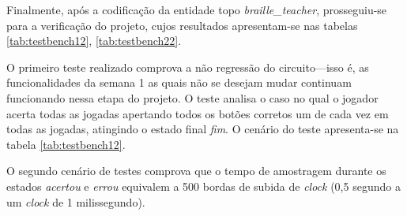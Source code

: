 \documentclass[amsmath,amssymb,floatfix]{report}
\begin{document}
Finalmente, após a codificação da entidade topo \textit{braille\_teacher}, prosseguiu-se para a verificação do projeto, cujos resultados apresentam-se nas tabelas \ref{tab:testbench12}, \ref{tab:testbench22}.

O primeiro teste realizado comprova a não regressão do circuito---isso é, as funcionalidades da semana 1 as quais não se desejam mudar continuam funcionando nessa etapa do projeto. O teste analisa o caso no qual o jogador acerta todas as jogadas apertando todos os botões corretos um de cada vez em todas as  jogadas, atingindo o estado final \textit{fim}. O cenário do teste apresenta-se na tabela \ref{tab:testbench12}.

O segundo cenário de testes comprova que o tempo de amostragem durante os estados \textit{acertou} e \textit{errou} equivalem a 500 bordas de subida de \textit{clock} (0,5 segundo a um \textit{clock} de 1 milissegundo).
\end{document}
